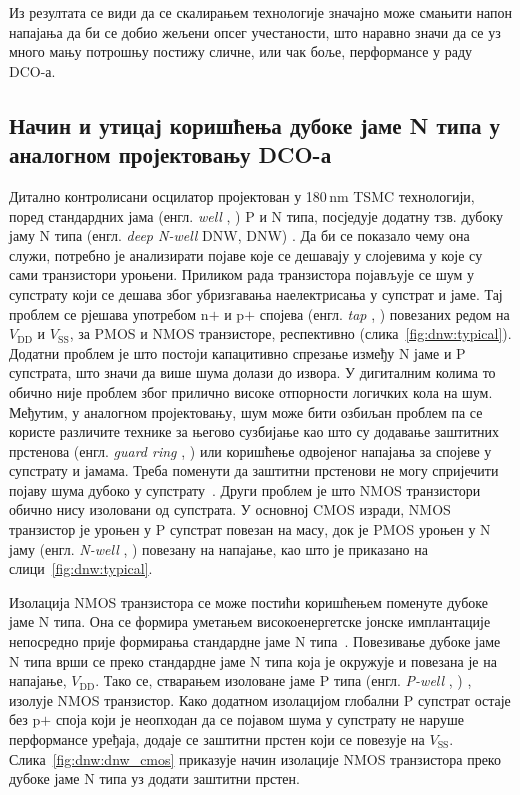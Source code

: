 \documentclass[master]{finthesis}
\makeatletter
\newcommand*{\engl}[2][\@empty]{%
    \edef\theacronym{#1}%
    (енгл. \foreignlanguage{english}{\emph{#2}%
    \ifx\theacronym\@empty \else , #1\fi})%
}
\def \DCO  {DCO} %
\makeatother
\begin{document}
Из резултата се види да се скалирањем технологије значајно може смањити напон напајања да би се добио жељени опсег учестаности, што наравно значи да се уз много мању потрошњу постижу сличне, или чак боље, перформансе у раду \DCO-а. \par
\subsection{Начин и утицај коришћења дубоке јаме N типа у аналогном пројектовању \DCO-а}
Дитално контролисани осцилатор пројектован у 180\,nm TSMC технологији, поред стандардних јама \engl{well} P и N типа, посједује додатну тзв. дубоку јаму N типа \engl[DNW]{deep N-well}. Да би се показало чему она служи, потребно је анализирати појаве које се дешавају у слојевима у које су сами транзистори уроњени. Приликом рада транзистора појављује се шум у супстрату који се дешава због убризгавања наелектрисања у супстрат и јаме. Тај проблем се рјешава употребом n$+$ и p$+$ спојева \engl{tap} повезаних редом на $V_\text{DD}$ и $V_\text{SS}$, за PMOS и NMOS транзисторе, респективно (слика~\ref{fig:dnw:typical}). Додатни проблем је што постоји капацитивно спрезање између N јаме и P супстрата, што значи да више шума долази до извора. У дигиталним колима то обично није проблем због прилично високе отпорности логичких кола на шум. Међутим, у аналогном пројектовању, шум може бити озбиљан проблем па се користе различите технике за његово сузбијање као што су додавање заштитних прстенова \engl{guard ring} или коришћење одвојеног напајања за спојеве у супстрату и јамама. Треба поменути да заштитни прстенови не могу спријечити појаву шума дубоко у супстрату~\cite{DNW:aspencore}. Други проблем је што NMOS транзистори обично нису изоловани од супстрата. У основној CMOS изради, NMOS транзистор је уроњен у P супстрат повезан на масу, док је PMOS уроњен у N јаму \engl{N-well} повезану на напајање, као што је приказано на слици~\ref{fig:dnw:typical}. \par

Изолација NMOS транзистора се може постићи коришћењем поменуте дубоке јаме N типа. Она се формира уметањем високоенергетске јонске имплантације непосредно прије формирања стандардне јаме N типа~\cite{DNW:1503847}. Повезивање дубоке јаме N типа врши се преко стандардне јаме N типа која је окружује и повезана је на напајање, $V_\text{DD}$. Тако се, стварањем изоловане јаме P типа \engl{P-well}, изолује NMOS транзистор. Како додатном изолацијом глобални P супстрат остаје без p$+$ споја који је неопходан да се појавом шума у супстрату не наруше перформансе уређаја, додаје се заштитни прстен који се повезује на $V_\text{SS}$. Слика~\ref{fig:dnw:dnw_cmos} приказује начин изолације NMOS транзистора преко дубоке јаме N типа уз додати заштитни прстен. \par
\end{document}

